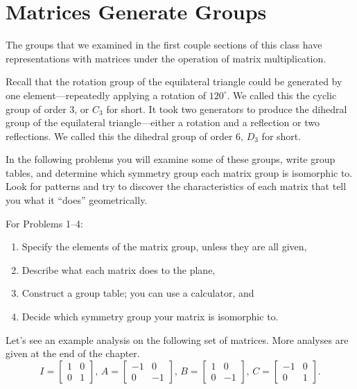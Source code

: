 \documentclass[../textbook.tex]{subfiles}
\begin{document}
\section{Matrices Generate Groups}

The groups that we examined in the first couple sections of this class have representations with matrices under the operation of matrix multiplication.

Recall that the rotation group of the equilateral triangle could be generated by one element---repeatedly applying a rotation of $120^\circ$. We called this the cyclic group of order $3$, or $C_3$ for short. It took two generators to produce the dihedral group of the equilateral triangle---either a rotation and a reflection or two reflections. We called this the dihedral group of order $6$, $D_3$ for short.

In the following problems you will examine some of these groups, write group tables, and determine which symmetry group each matrix group is isomorphic to. Look for patterns and try to discover the characteristics of each matrix that tell you what it ``does'' geometrically.

For Problems 1--4:
\begin{enumerate}[label=(\alph*)]
\item Specify the elements of the matrix group, unless they are all given, %
\item Describe what each matrix does to the plane, %
\item Construct a group table; you can use a calculator, and %
\item Decide which symmetry group your matrix is isomorphic to. %
\end{enumerate}

\noindent Let's see an example analysis on the following set of matrices. More analyses are given at the end of the chapter.
$$I=\left[\begin{array}{cc} 1 & 0 \\ 0 & 1 \end{array}\right],\, A=\left[\begin{array}{cc} -1 & 0 \\ 0 & -1 \end{array}\right],\,  B=\left[\begin{array}{cc} 1 & 0 \\ 0 & -1 \end{array}\right],\, C=\left[\begin{array}{cc} -1 & 0 \\ 0 & 1 \end{array}\right].$$
\end{document}

